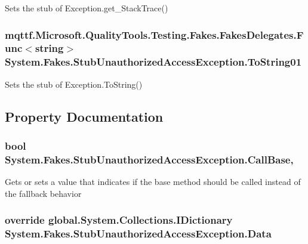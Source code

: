 Sets the stub of Exception.\-get\-\_\-\-Stack\-Trace()

\hypertarget{class_system_1_1_fakes_1_1_stub_unauthorized_access_exception_a81fbecf265857505ccd6bc89eee8c688}{
\subsubsection[{To\-String01}]{\setlength{\rightskip}{0pt plus 5cm}mqttf.\-Microsoft.\-Quality\-Tools.\-Testing.\-Fakes.\-Fakes\-Delegates.\-Func$<$string$>$ System.\-Fakes.\-Stub\-Unauthorized\-Access\-Exception.\-To\-String01}}\label{class_system_1_1_fakes_1_1_stub_unauthorized_access_exception_a81fbecf265857505ccd6bc89eee8c688}


Sets the stub of Exception.\-To\-String()



\subsection{Property Documentation}
\hypertarget{class_system_1_1_fakes_1_1_stub_unauthorized_access_exception_ab49b491d0b682bf2bf2a4ffa162b3a37}{
\subsubsection[{Call\-Base}]{\setlength{\rightskip}{0pt plus 5cm}bool System.\-Fakes.\-Stub\-Unauthorized\-Access\-Exception.\-Call\-Base\hspace{0.3cm}{\ttfamily [get]}, {\ttfamily [set]}}}\label{class_system_1_1_fakes_1_1_stub_unauthorized_access_exception_ab49b491d0b682bf2bf2a4ffa162b3a37}


Gets or sets a value that indicates if the base method should be called instead of the fallback behavior

\hypertarget{class_system_1_1_fakes_1_1_stub_unauthorized_access_exception_a04c2357d9478537bad7a276a8a1ee0fc}{
\subsubsection[{Data}]{\setlength{\rightskip}{0pt plus 5cm}override global.\-System.\-Collections.\-I\-Dictionary System.\-Fakes.\-Stub\-Unauthorized\-Access\-Exception.\-Data\hspace{0.3cm}{\ttfamily [get]}}}\label{class_system_1_1_fakes_1_1_stub_unauthorized_access_exception_a04c2357d9478537bad7a276a8a1ee0fc}


